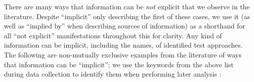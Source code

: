 There are many ways that
information can be \emph{not} explicit that we observe in the literature.
Despite ``implicit'' only describing the first of these cases, we use it
(as well as ``implied by'' when describing sources of information) as a
shorthand for all ``not explicit'' manifestations throughout this \docType{}
for clarity. Any kind of information can be implicit,
including the names, \approachFields{} of identified test approaches. The
following are non-mutually exclusive
examples from the literature of ways that information can be ``implicit'';
we use the keywords from the above list during data collection to identify
them when performing later analysis \impKeywordsCode{}:


